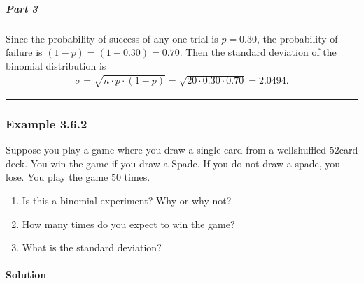 \documentclass[letterpaper,10pt,english]{jupyterBook}
\begin{document}
\subparagraph{Part 3}
\label{\detokenize{Ch3 Probability/3.6 The Binomial Distribution:part-3}}
\sphinxAtStartPar
Since the probability of success of any one trial is \(p = 0.30\), the probability of failure is \((1-p) = (1 - 0.30) = 0.70\). Then the standard deviation of the binomial distribution is
\begin{equation*}
\begin{split} \sigma = \sqrt{n \cdot p \cdot (1-p)} = \sqrt{20 \cdot 0.30 \cdot 0.70} = 2.0494. \end{split}
\end{equation*}

\bigskip\hrule\bigskip



\subsubsection{Example 3.6.2}
\label{\detokenize{Ch3 Probability/3.6 The Binomial Distribution:example-3-6-2}}
\sphinxAtStartPar
Suppose you play a game where you draw a single card from a well\sphinxhyphen{}shuffled \(52\)\sphinxhyphen{}card deck. You win the game if you draw a Spade. If you do not draw a spade, you lose. You play the game \(50\) times.
\begin{enumerate}
%
\item {} 
\sphinxAtStartPar
Is this a binomial experiment? Why or why not?

\item {} 
\sphinxAtStartPar
How many times do you expect to win the game?

\item {} 
\sphinxAtStartPar
What is the standard deviation?

\end{enumerate}


\paragraph{Solution}
\label{\detokenize{Ch3 Probability/3.6 The Binomial Distribution:id2}}
\end{document}
